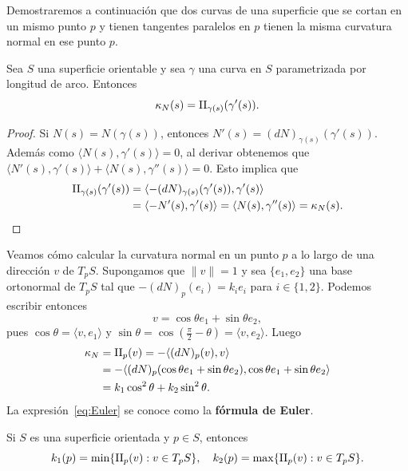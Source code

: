 Demostraremos a continuación que dos curvas de una superficie que se cortan en
un mismo punto $p$ y tienen tangentes paralelos en $p$ tienen la misma
curvatura normal en ese punto $p$.

\begin{theorem}[Meusnier]
	Sea $S$ una superficie orientable y sea $\gamma$ una curva en $S$
	parametrizada por longitud de arco.  Entonces
	\[
		\kappa_N(s)=\operatorname{II}_{\gamma(s)}(\gamma'(s)).
	\]
\end{theorem}

\begin{proof}
	Si $N(s)=N(\gamma(s))$, entonces
	$N'(s)=(dN)_{\gamma(s)}(\gamma'(s))$. Además 
	como $\langle
	N(s),\gamma'(s)\rangle=0$, al derivar obtenemos que $\langle
	N'(s),\gamma'(s)\rangle+\langle N(s),\gamma''(s)\rangle=0$. 
	Esto implica que 
	\begin{align*}
		\operatorname{II}_{\gamma(s)}(\gamma'(s))
		&=\langle -(dN)_{\gamma(s)}(\gamma'(s)),\gamma'(s)\rangle\\
		&=\langle -N'(s),\gamma'(s)\rangle
		=\langle N(s),\gamma''(s)\rangle
		=\kappa_N(s).\qedhere
	\end{align*}
\end{proof}

Veamos cómo calcular la curvatura normal en un punto $p$ a lo largo de una
dirección $v$ de $T_pS$. Supongamos que $\|v\|=1$ y sea $\{e_1,e_2\}$ una base
ortonormal de $T_pS$ tal que $-(dN)_p(e_i)=k_ie_i$ para $i\in\{1,2\}$. Podemos
escribir entonces
\[
	v=\cos\theta e_1+\sin\theta e_2,
\]
pues $\cos\theta=\langle v,e_1\rangle$ y
$\sin\theta=\cos(\frac{\pi}{2}-\theta)=\langle v,e_2\rangle$. Luego
\begin{equation}
	\label{eq:Euler}
\begin{aligned}
	\kappa_N&=\operatorname{II}_p(v)=-\langle (dN)_p(v),v\rangle\\
	&=-\langle (dN)_p(\cos\theta e_1+\sin\theta e_2),\cos\theta e_1+\sin\theta e_2\rangle\\
	&=k_1\cos^2\theta +k_2\sin^2\theta.
\end{aligned}
\end{equation}
La expresión~\eqref{eq:Euler} se conoce como la \textbf{fórmula de Euler}. 

\begin{theorem}
	\label{thm:k1min_k2max}
	Si $S$ es una superficie orientada y $p\in S$, entonces
	\[
		k_1(p)=\min\{\operatorname{II}_p(v):v\in T_pS\},\quad
		k_2(p)=\max\{\operatorname{II}_p(v):v\in T_pS\}.
	\]
\end{theorem}

